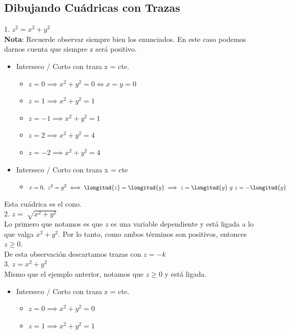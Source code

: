 \documentclass[10pt,a4paper]{article}
\begin{document}
\subsection*{Dibujando Cuádricas con Trazas}
\label{subsec:dibujando_cuadricas_con_trazas}
1. $z^{2} = x^{2} + y^{2}$ \\
\textbf{Nota}: Recuerde observar siempre bien los enunciados. En este caso podemos darnos cuenta que siempre z será positivo.
\begin{itemize}
    \item Interseco / Corto con traza z = cte.
    \begin{itemize}
        \item $ z = 0 \implies x^{2} + y^{2} = 0 \iff x = y = 0$
        \item $ z = 1 \implies x^{2} + y^{2} = 1$
        \item $ z = -1 \implies x^{2} + y^{2} = 1$
        \item $ z = 2 \implies x^{2} + y^{2} = 4$
        \item $ z = -2 \implies x^{2} + y^{2} = 4$
    \end{itemize}
    \item Interseco / Corto con traza x = cte
    \begin{itemize}
        \item $x = 0, \ z^{2} = y^{2} \iff \longitud{z} = \longitud{y} \implies z = \longitud{y} \ y \ z = -\longitud{y}$
    \end{itemize}
\end{itemize}
Esta cuádrica es el cono. \\
2. $z = \sqrt[]{x^{2} + y^{2}}$ \\
Lo primero que notamos es que $z$ es una variable dependiente y está ligada a lo que valga $x^{2} + y^{2}$. Por lo tanto, como ambos términos son positivos, entonces $z \ge 0 $. \\
De esta observación descartamos trazas con $ z = -k $ \\
3. $z = x^{2} + y^{2}$ \\
Mismo que el ejemplo anterior, notamos que $z \ge 0$ y está ligada. \\
\begin{itemize}
    \item Interseco / Corto con traza z = cte.
    \begin{itemize}
        \item $z=0 \implies x^{2} + y^{2} = 0$
        \item $z=1 \implies x^{2} + y^{2} = 1$
    \end{itemize}
\end{itemize}
\end{document}

